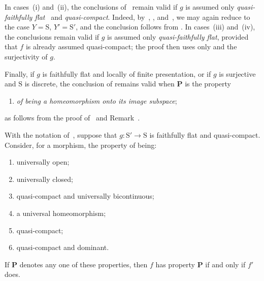 \begin{remark}[2.6.3]
\label{IV.2.6.3}
In cases~(i) and~(ii), the conclusions of~ remain valid
if $g$ is assumed only \emph{quasi-faithfully flat}~
and \emph{quasi-compact}. Indeed, by~, ,
and~, we may again reduce to the case
$Y=\mathrm{S}$, $Y'=\mathrm{S}'$, and the conclusion follows from
. In cases~(iii) and~(iv), the conclusions remain valid
if $g$ is assumed only \emph{quasi-faithfully flat}, provided that $f$ is
already assumed quasi-compact; the proof then uses only
 and the surjectivity of $g$.

Finally, if $g$ is faithfully flat and locally of finite presentation,
or if $g$ is surjective and $\mathrm{S}$ is discrete, the conclusion of
 remains valid when $\boldsymbol{P}$ is the property
\begin{enumerate}
  \item[(iii \emph{bis})] \emph{of being a homeomorphism onto its image
    subspace};
\end{enumerate}
as follows from the proof of~ and
Remark~.
\end{remark}

\begin{corollary}[2.6.4]
\label{IV.2.6.4}
With the notation of~, suppose that
$g:\mathrm{S}'\to\mathrm{S}$ is faithfully flat and quasi-compact.
Consider, for a morphism, the property of being:
\begin{enumerate}
  \item[\textup{(i)}] universally open;
  \item[\textup{(ii)}] universally closed;
  \item[\textup{(iii)}] quasi-compact and universally bicontinuous;
  \item[\textup{(iv)}] a universal homeomorphism;
  \item[\textup{(v)}] quasi-compact;
  \item[\textup{(vi)}] quasi-compact and dominant.
\end{enumerate}
If $\boldsymbol{P}$ denotes any one of these properties, then $f$ has
property $\boldsymbol{P}$ if and only if $f'$ does.
\end{corollary}

